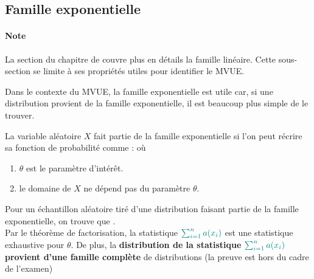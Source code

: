 \documentclass[10pt, french]{article}
\begin{document}
\begin{multicols*}{2}
\columnbreak
\subsection{Famille exponentielle}\label{subsec:FamExpMVUE}
\paragraph{Note}	La section \underline{\textit{}} du chapitre de \underline{\textit{}} couvre plus en détails la famille linéaire. Cette sous-section se limite à ses propriétés utiles pour identifier le MVUE.

\begin{rappel_enhanced}[Contexte]
Dans le contexte du MVUE, la famille exponentielle est utile car, si une distribution provient de la famille exponentielle, il est beaucoup plus simple de le trouver.
\end{rappel_enhanced}

\begin{definitionNOHFILL}
La variable aléatoire $X$ fait partie de la famille exponentielle si l'on peut récrire sa fonction de probabilité comme :  où 
\begin{enumerate}[label = \circled{\arabic*}{trueblue}]
	\item	$\theta$ est le paramètre d'intérêt.
	\item	le domaine de $X$ ne dépend pas du paramètre $\theta$.
\end{enumerate}
\end{definitionNOHFILL}

\begin{definitionNOHFILLprop}
Pour un échantillon aléatoire tiré d'une distribution faisant partie de la famille exponentielle, on trouve que .\\

Par le théorème de factorisation, la statistique $\textcolor{teal}{\sum_{i = 1}^{n} a(x_{i})}$ est une statistique exhaustive pour $\theta$. De plus, la \textbf{distribution de la statistique} $\textcolor{teal}{\sum_{i = 1}^{n} a(x_{i})}$ \textbf{provient d'une famille complète} de distributions (la preuve est hors du cadre de l'examen)
\end{definitionNOHFILLprop}


\end{multicols*}
\end{document}
